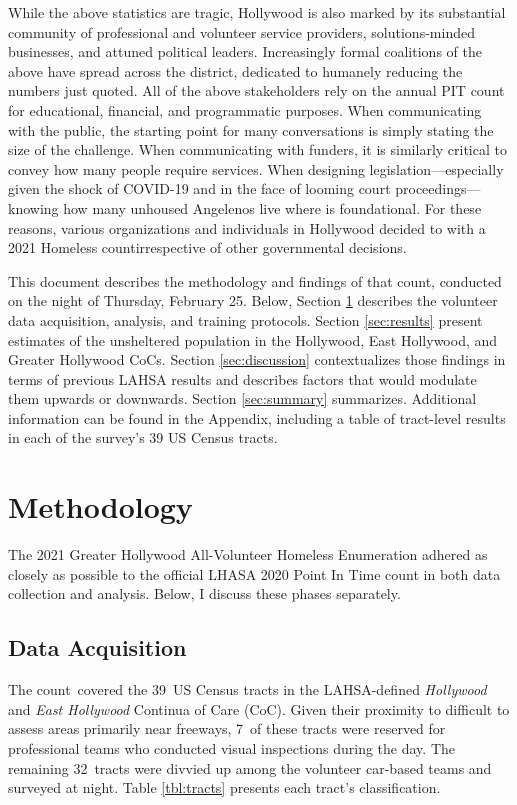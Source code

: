 \documentclass[11pt]{article}
\def\Count{count}
\def\ntracts{39}
\def\nprof{7}
\def\nvol{32}
\begin{document}
While the above statistics are tragic, Hollywood is also marked by its substantial community of professional
and volunteer service providers, solutions-minded businesses, and attuned political leaders. Increasingly
formal coalitions of the above have spread across the district, dedicated to humanely reducing the numbers 
just quoted. All of the above stakeholders rely on the annual PIT count for educational, financial, and 
programmatic purposes. When communicating with the public, the starting point for many conversations
is simply stating the size of the challenge. When communicating with funders, it is similarly critical to convey
how many people require services. When designing legislation---especially given the shock of 
COVID-19 and in the face of looming court proceedings---knowing how many unhoused Angelenos live
where is foundational. For these reasons, various organizations and individuals in Hollywood decided to 
with a 2021 Homeless \Count irrespective of other governmental decisions.

This document describes the methodology and findings of that \Count, conducted on the night of 
Thursday, February 25. Below, Section \ref{sec:procedure} describes the volunteer data acquisition, 
analysis, and training protocols. Section \ref{sec:results} present estimates of the unsheltered 
population in the Hollywood, East Hollywood, and Greater Hollywood CoCs. Section \ref{sec:discussion}
contextualizes those findings in terms of previous LAHSA results and describes factors that would
modulate them upwards or downwards. Section \ref{sec:summary} summarizes. Additional information
can be found in the Appendix, including a table of tract-level results in each of the survey's 39 US 
Census tracts.

\section{Methodology}
\label{sec:procedure}

The 2021 Greater Hollywood All-Volunteer Homeless Enumeration adhered as closely as possible to the
official LHASA 2020 Point In Time count in both data collection and analysis. Below, I discuss these 
phases separately.

\subsection{Data Acquisition}
\label{sec:acquisition}

The \Count\ covered the \ntracts\ US Census tracts in the LAHSA-defined {\it Hollywood} and 
{\it East Hollywood} Continua of Care (CoC). Given their proximity to difficult to assess areas 
primarily near freeways, \nprof\ of these tracts were reserved for professional teams who conducted
visual inspections during the day. The remaining \nvol\ tracts were divvied up among the 
volunteer car-based teams and surveyed at night. Table \ref{tbl:tracts} presents each tract's
classification.
\end{document}
